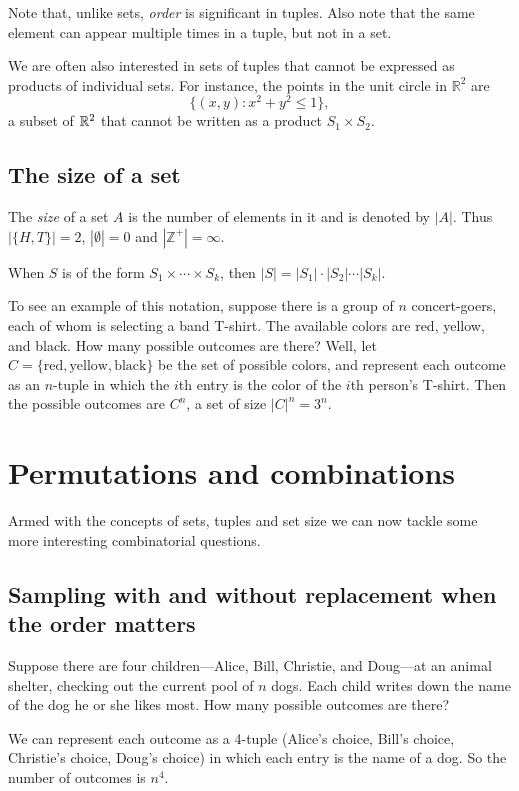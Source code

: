 Note that, unlike sets, {\em order} is significant in tuples. Also
note that the same element can appear multiple times in a tuple, but
not in a set.

We are often also interested in sets of tuples that cannot be expressed as 
products of individual sets. For instance, the points in the unit circle in
$\mathbb{R}^2$ are
$$ \{(x,y): x^2 + y^2 \leq 1 \},$$
a subset of $\mathbb{R}^2$ that cannot be written as a product $S_1 \times S_2$.

\subsection{The size of a set}

The {\em size} of a set $A$ is the number of elements in it and is denoted
by $|A|$. Thus $|\{H,T\}|=2$, $|\emptyset|=0$ and $|\mathbb{Z}^+|=\infty$.

When $S$ is of the form 
$S_1 \times \cdots \times S_k$, then
$|S| = |S_1| \cdot |S_2| \cdots |S_k|$.

To see an example of this notation, suppose there is a group of $n$
concert-goers, each of whom is selecting a band T-shirt. The available
colors are red, yellow, and black. How many possible outcomes are
there? Well, let $C = \{\mbox{red}, \mbox{yellow}, \mbox{black}\}$ be
the set of possible colors, and represent each outcome as an $n$-tuple
in which the $i$th entry is the color of the $i$th person's T-shirt.
Then the possible outcomes are $C^n$, a set of size $|C|^n = 3^n$.

\section{Permutations and combinations}

Armed with the concepts of sets, tuples and set size we can now tackle
some more interesting combinatorial questions.

\subsection{Sampling with and without replacement when the order matters}

Suppose there are four children---Alice, Bill, Christie, and Doug---at an animal
shelter, checking out the current pool of $n$ dogs. Each child writes down the 
name of the dog he or she likes most. How many possible outcomes are there?

We can represent each outcome as a 4-tuple (Alice's choice, Bill's choice,
Christie's choice, Doug's choice) in which each entry is the name of a dog. 
So the number of outcomes is $n^4$.

